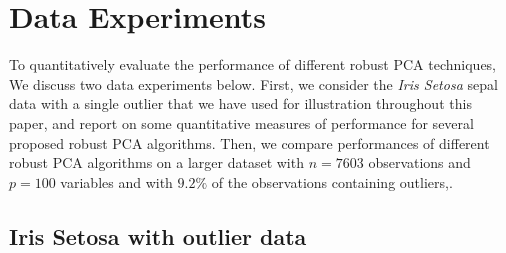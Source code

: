 \documentclass[ss]{imsart}
\theoremstyle{Example}
\newcommand{\attention}[1]{{\color{red}{\textbf{[ATTENTION:#1]}}}}
\begin{document}

\section{Data Experiments}
\label{Sec:DataExpt}
To quantitatively evaluate the performance of different robust PCA techniques, We discuss two data experiments below. First, we consider the \textit{Iris Setosa} sepal data with a single outlier that we have used for illustration throughout this paper, and report on some quantitative measures of performance for several proposed robust PCA algorithms. Then, we compare performances of different robust PCA algorithms on a larger dataset with $n = 7603$ observations and $p = 100$ variables and with $9.2\%$ of the observations containing outliers,.

\subsection{Iris Setosa with outlier data}
\end{document}
